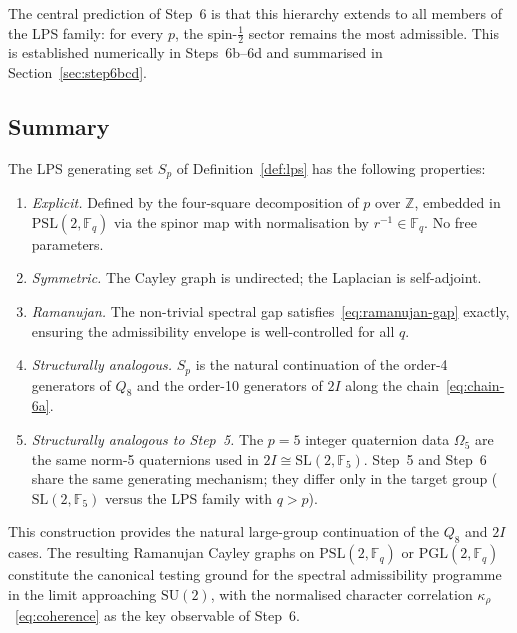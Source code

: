 \documentclass[11pt,a4paper]{article}
\begin{document}
    The central prediction of Step~6 is that this hierarchy extends to all
    members of the LPS family: for every $p$, the spin-$\tfrac{1}{2}$ sector
    remains the most admissible.
    This is established numerically in Steps~6b--6d and summarised in
    Section~\ref{sec:step6bcd}.

  \subsection{Summary}
    \label{sec:step6a-summary}

    The LPS generating set $S_p$ of Definition~\ref{def:lps} has the
    following properties:
    \begin{enumerate}
      \item \emph{Explicit.} Defined by the four-square decomposition of $p$
      over $\mathbb{Z}$, embedded in $\mathrm{PSL}(2,\mathbb{F}_q)$ via the
      spinor map with normalisation by $r^{-1} \in \mathbb{F}_q$.
      No free parameters.
      \item \emph{Symmetric.} The Cayley graph is undirected; the Laplacian
      is self-adjoint.
      \item \emph{Ramanujan.} The non-trivial spectral gap
      satisfies~\eqref{eq:ramanujan-gap} exactly, ensuring the
      admissibility envelope is well-controlled for all $q$.
      \item \emph{Structurally analogous.} $S_p$ is the natural continuation
      of the order-4 generators of $Q_8$ and the order-10 generators of
      $2I$ along the chain~\eqref{eq:chain-6a}.
      \item \emph{Structurally analogous to Step~5.}
      The $p = 5$ integer quaternion data $\Omega_5$ are the same norm-5
      quaternions used in $2I \cong \mathrm{SL}(2,\mathbb{F}_5)$.
      Step~5 and Step~6 share the same generating mechanism; they differ
      only in the target group ($\mathrm{SL}(2,\mathbb{F}_5)$ versus the
      LPS family with $q > p$).
    \end{enumerate}
    This construction provides the natural large-group continuation of the
    $Q_8$ and $2I$ cases.
    The resulting Ramanujan Cayley graphs on $\mathrm{PSL}(2,\mathbb{F}_q)$
    or $\mathrm{PGL}(2,\mathbb{F}_q)$ constitute the canonical testing ground
    for the spectral admissibility programme in the limit approaching
    $\mathrm{SU}(2)$, with the normalised character correlation
    $\kappa_\rho$~\eqref{eq:coherence} as the key observable of Step~6.
\end{document}

